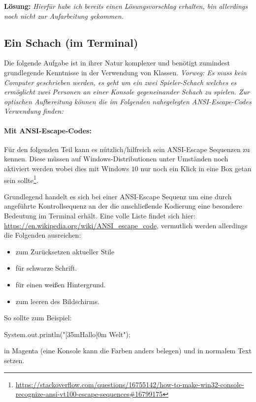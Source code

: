 \documentclass[table]{sopra-base}
\makeatletter
\newenvironment{solution}{\null\par\noindent\textbf{\textcolor{sob@col@uulm@cs}{Lösung:}}\newline\bgroup\color{black}\slshape\ignorespaces}{\egroup}
\makeatother
\begin{document}
\begin{solution}
    Hierfür habe ich bereits einen Lösungsvorschlag erhalten, bin allerdings noch nicht zur Aufarbeitung gekommen.
\end{solution}

\subsection{Ein Schach (im Terminal)}
Die folgende Aufgabe ist in ihrer Natur komplexer und benötigt zumindest grundlegende Kenntnisse in der Verwendung von Klassen. \textit{Vorweg: Es muss kein Computer geschrieben
werden, es geht um ein zwei Spieler-Schach welches es ermöglicht zwei Personen an einer
Konsole gegeneinander Schach zu spielen. Zur optischen Aufbereitung können die im Folgenden nahegelegten ANSI-Escape-Codes Verwendung finden:}\par
\paragraph{Mit ANSI-Escape-Codes:}
Für den folgenden Teil kann es nützlich/hilfreich sein ANSI-Escape Sequenzen zu kennen. Diese müssen auf Windows-Distributionen unter Umständen noch aktiviert werden wobei dies mit Windows $10$ nur noch ein Klick in eine Box getan sein sollte\footnote{\url{https://stackoverflow.com/questions/16755142/how-to-make-win32-console-recognize-ansi-vt100-escape-sequences\#16799175}}.\par{}
Grundlegend handelt es sich bei einer ANSI-Escape Sequenz um eine durch \bjava{\\033[}
angeführte Kontrollsequenz an der die anschließende Kodierung eine besondere Bedeutung im
Terminal erhält. Eine volle Liste findet sich hier: \url{https://en.wikipedia.org/wiki/ANSI_escape_code}, vermutlich werden allerdings die Folgenden ausreichen:
\begin{multicols}{2}
    \begin{itemize}
        \item \say{\bjava{\\033[0m}} zum Zurücksetzen aktueller Stile
        \item \say{\bjava{\\033[30m}} für schwarze Schrift.
        \item \say{\bjava{\\033[47m}} für einen weißen Hintergrund.
        \item \say{\bjava{\\033[H\\033[2J}} zum leeren des Bildschirms.
    \end{itemize}
\end{multicols}
So sollte zum Beispiel:
\begin{java*}
System.out.println("[35mHallo[0m Welt");
\end{java*}
 in Magenta (eine Konsole kann die Farben anders belegen) und  in normalem Text setzen.
\end{document}
